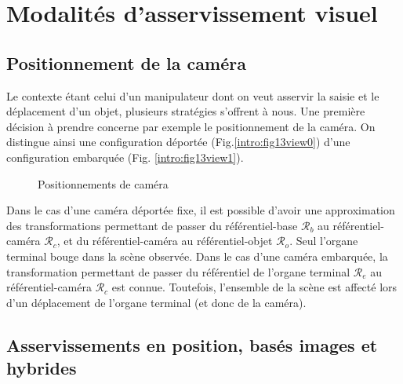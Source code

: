 \section{Modalit\'es d'asservissement visuel} 
\label{chap1-1}



\subsection{Positionnement de la caméra} \label{chap1-1-0}

Le contexte étant celui d'un manipulateur dont on veut asservir la saisie et le déplacement d'un objet, plusieurs stratégies s'offrent 
à nous. Une première décision à prendre concerne par exemple le positionnement 
de la caméra. On distingue ainsi une configuration déportée 
(Fig.\ref{intro:fig13view0}) d'une configuration embarquée (Fig. 
\ref{intro:fig13view1}).

\begin{figure}[htp]
  \centering
   \hfill
    \caption{\footnotesize{Positionnements de caméra}}
\label{intro:fig13}
\end{figure}

Dans le cas d'une caméra déportée fixe, il est possible d'avoir une approximation des transformations permettant de 
passer du référentiel-base $\mathcal R_b$ au référentiel-caméra $\mathcal R_c$, 
et du référentiel-caméra au référentiel-objet $\mathcal R_o$. Seul l'organe 
terminal bouge dans la scène observée. Dans le cas d'une caméra embarquée, la 
transformation permettant de passer du référentiel de l'organe terminal 
$\mathcal R_e$ au référentiel-caméra $\mathcal R_c$ est connue. Toutefois, 
l'ensemble de la scène est affecté lors d'un déplacement de l'organe terminal 
(et donc de la caméra).

\subsection{Asservissements en position, basés images et hybrides} 
\label{chap1-1-1}

